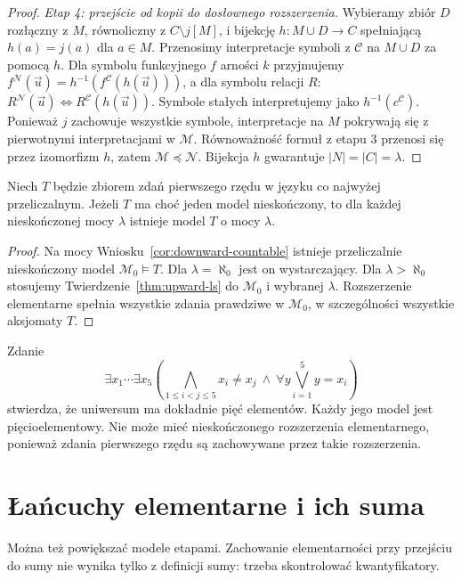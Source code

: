 \begin{proof}
\emph{Etap 4: przejście od kopii do dosłownego rozszerzenia.}
Wybieramy zbiór $D$ rozłączny z $M$,
równoliczny z $C\setminus j[M]$,
i bijekcję $h:M\cup D\to C$
spełniającą $h(a)=j(a)$ dla $a\in M$.
Przenosimy interpretacje symboli z $\mathcal C$
na $M\cup D$ za pomocą $h$.
Dla symbolu funkcyjnego $f$ arności $k$
przyjmujemy
$f^{\mathcal N}(\vec u)=
h^{-1}(f^{\mathcal C}(h(\vec u)))$,
a dla symbolu relacji $R$:
$R^{\mathcal N}(\vec u)\Longleftrightarrow
R^{\mathcal C}(h(\vec u))$.
Symbole stałych interpretujemy jako
$h^{-1}(c^{\mathcal C})$.
Ponieważ $j$ zachowuje wszystkie symbole,
interpretacje na $M$ pokrywają się
z pierwotnymi interpretacjami w $\mathcal M$.
Równoważność formuł z etapu 3 przenosi się
przez izomorfizm $h$, zatem
$\mathcal M\preccurlyeq\mathcal N$.
Bijekcja $h$ gwarantuje $|N|=|C|=\lambda$.
\end{proof}

\begin{wniosek}
\label{cor:ls-all-infinite-cardinals}
Niech $T$ będzie zbiorem zdań pierwszego rzędu
w języku co najwyżej przeliczalnym.
Jeżeli $T$ ma choć jeden model nieskończony,
to dla każdej nieskończonej mocy $\lambda$
istnieje model $T$ o mocy $\lambda$.
\end{wniosek}
\begin{proof}
Na mocy Wniosku~\ref{cor:downward-countable}
istnieje przeliczalnie nieskończony model
$\mathcal M_0\models T$.
Dla $\lambda=\aleph_0$ jest on wystarczający.
Dla $\lambda>\aleph_0$
stosujemy Twierdzenie~\ref{thm:upward-ls}
do $\mathcal M_0$ i wybranej $\lambda$.
Rozszerzenie elementarne spełnia wszystkie
zdania prawdziwe w $\mathcal M_0$,
w szczególności wszystkie aksjomaty $T$.
\end{proof}

\begin{przyklad}
\label{ex:ls-finite-models}
Zdanie
\[
\exists x_1\cdots\exists x_5\left(
\bigwedge_{1\le i<j\le5}x_i\ne x_j
\ \land\
\forall y\bigvee_{i=1}^{5}y=x_i\right)
\]
stwierdza, że uniwersum ma dokładnie pięć elementów.
Każdy jego model jest pięcioelementowy.
Nie może mieć nieskończonego rozszerzenia elementarnego,
ponieważ zdania pierwszego rzędu są zachowywane
przez takie rozszerzenia.
\end{przyklad}

\section{Łańcuchy elementarne i ich suma}
Można też powiększać modele etapami.
Zachowanie elementarności przy przejściu do
sumy nie wynika tylko z definicji sumy:
trzeba skontrolować kwantyfikatory.

